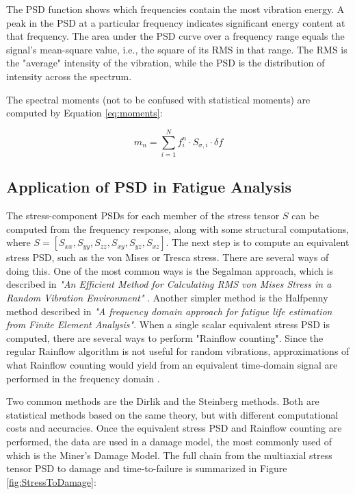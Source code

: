 \documentclass[a4paper,twoside]{bth}
\begin{document}
The \ac{PSD} function shows which frequencies contain the most vibration energy. A peak in the \ac{PSD} at a particular frequency indicates significant energy content at that frequency. The area under the \ac{PSD} curve over a frequency range equals the signal's mean-square value, i.e., the square of its \ac{RMS} in that range. The \ac{RMS} is the "average" intensity of the vibration, while the \ac{PSD} is the distribution of intensity across the spectrum.

The spectral moments (not to be confused with statistical moments) are computed by Equation \ref{eq:moments}:

\begin{equation} \label{eq:moments}
    m_n = \sum^N_{i=1} f_i^n \cdot S_{\sigma, i} \cdot \delta f
\end{equation}

\subsection{Application of PSD in Fatigue Analysis}
The stress-component \ac{PSD}s for each member of the stress tensor $S$ can be computed from the frequency response, along with some structural computations, where $S = [S_{xx}, S_{yy}, S_{zz}, S_{xy}, S_{yz}, S_{xz}]$. The next step is to compute an equivalent stress \ac{PSD}, such as the von Mises or Tresca stress. There are several ways of doing this. One of the most common ways is the Segalman approach, which is described in \textit{"An Efficient Method for Calculating \ac{RMS} von Mises Stress in a Random Vibration Environment"} \cite{segalman_efficient_2000}. Another simpler method is the Halfpenny method described in \textit{"A frequency domain approach for fatigue life estimation from Finite Element Analysis"}. When a single scalar equivalent stress \ac{PSD} is computed, there are several ways to perform "Rainflow counting". Since the regular Rainflow algorithm is not useful for random vibrations, approximations of what Rainflow counting would yield from an equivalent time-domain signal are performed in the frequency domain \cite{halfpenny_frequency_1999}.

Two common methods are the Dirlik and the Steinberg methods. Both are statistical methods based on the same theory, but with different computational costs and accuracies. Once the equivalent stress \ac{PSD} and Rainflow counting are performed, the data are used in a damage model, the most commonly used of which is the Miner's Damage Model. The full chain from the multiaxial stress tensor PSD to damage and time-to-failure is summarized in Figure \ref{fig:StressToDamage}:
\end{document}
